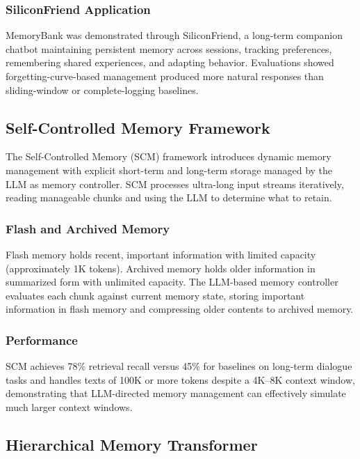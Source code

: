 \documentclass[11pt,letterpaper]{article}
\begin{document}
\subsubsection{SiliconFriend Application}

MemoryBank was demonstrated through SiliconFriend, a long-term companion chatbot maintaining persistent memory across sessions, tracking preferences, remembering shared experiences, and adapting behavior. Evaluations showed forgetting-curve-based management produced more natural responses than sliding-window or complete-logging baselines.

\subsection{Self-Controlled Memory Framework}

The Self-Controlled Memory (SCM) framework \cite{liang2023scm} introduces dynamic memory management with explicit short-term and long-term storage managed by the LLM as memory controller. SCM processes ultra-long input streams iteratively, reading manageable chunks and using the LLM to determine what to retain.

\subsubsection{Flash and Archived Memory}

Flash memory holds recent, important information with limited capacity (approximately 1K tokens). Archived memory holds older information in summarized form with unlimited capacity. The LLM-based memory controller evaluates each chunk against current memory state, storing important information in flash memory and compressing older contents to archived memory.

\subsubsection{Performance}

SCM achieves 78\% retrieval recall versus 45\% for baselines on long-term dialogue tasks and handles texts of 100K or more tokens despite a 4K--8K context window, demonstrating that LLM-directed memory management can effectively simulate much larger context windows.

\subsection{Hierarchical Memory Transformer}
\end{document}
